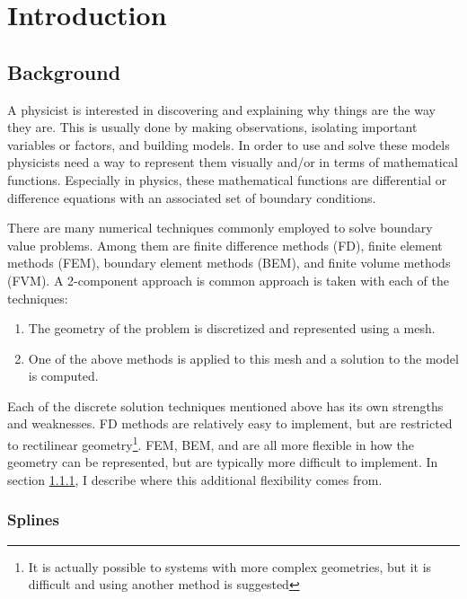\section{Introduction} \label{sec:Intro}

  \subsection{Background} \label{ssec:background}

    A physicist is interested in discovering and explaining why things are the way they are. This is usually done by making observations, isolating important variables or factors, and building models. In order to use and solve these models physicists need a way to represent them visually and/or in terms of mathematical functions. Especially in physics, these mathematical functions are differential or difference equations with an associated set of boundary conditions.

    There are many numerical techniques commonly employed to solve boundary value problems. Among them are finite difference methods (FD), finite element methods (FEM), boundary element methods (BEM), and finite volume methods (FVM). A 2-component approach is common approach is taken with each of the techniques:

    \begin{enumerate}[1)]
      \item The geometry of the problem is discretized and represented using a mesh.
      \item One of the above methods is applied to this mesh and a solution to the model is computed.
    \end{enumerate}
    \mainstretch

    Each of the discrete solution techniques mentioned above has its own strengths and weaknesses. FD methods are relatively easy to implement, but are restricted to rectilinear geometry\footnote{It is actually possible to systems with more complex geometries, but it is difficult and using another method is suggested}. FEM, BEM, and are all more flexible in how the geometry can be represented, but are typically more difficult to implement. In section \ref{ssub:splines}, I describe where this additional flexibility comes from.

    \subsubsection{Splines} \label{ssub:splines}

